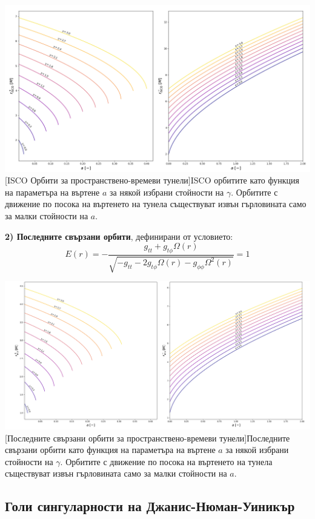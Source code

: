 \includegraphics[scale = 0.35]{WH_ISCO.png}
[ISCO Орбити за пространствено-времеви тунели]{\small ISCO орбитите като функция на параметъра на въртене $a$ за някой избрани стойности на $\gamma$. Орбитите с движение по посока на въртенето на тунела съществуват извън гърловината само за малки стойности на $a$.}
\label{WH_ISCO}

$ $\newline\textbf{2) Последните свързани орбити}, дефинирани от условието:
\begin{equation}
	E(r) = -\frac{g_{tt} + g_{t\phi}\Omega(r)}{\sqrt{-g_{tt} - 2g_{t\phi}\Omega(r) - g_{\phi\phi}\Omega^2(r)}} = 1
\end{equation}

\hspace{-0.5cm}
\includegraphics[scale = 0.3]{WH_mb.png}
[Последните свързани орбити за пространствено-времеви тунели]{\small Последните свързани орбити като функция на параметъра на въртене $a$ за някой избрани стойности на $\gamma$. Орбитите с движение по посока на въртенето на тунела съществуват извън гърловината само за малки стойности на $a$.}
\label{WH_mb}

\newpage
\subsection{Голи сингуларности на Джанис-Нюман-Уиникър}


